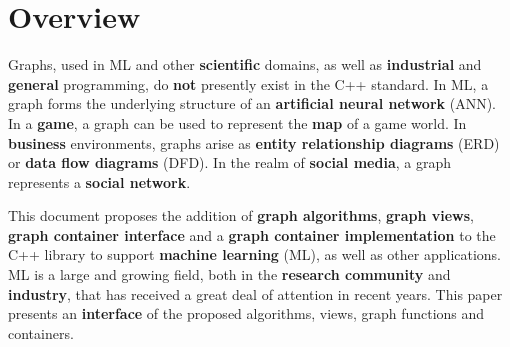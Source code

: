 
\chapter{Overview}

Graphs, used in ML and other \textbf{scientific} domains, as well as \textbf{industrial} and \textbf{general} programming, 
do \textbf{not} presently exist in the C++ standard. In ML, a graph forms the underlying structure of an \textbf{artificial neural network} (ANN). 
In a \textbf{game}, a graph can be used to represent the \textbf{map} of a game world. In \textbf{business} environments, graphs arise as 
\textbf{entity relationship diagrams} (ERD) or \textbf{data flow diagrams} (DFD). In the realm of \textbf{social media}, a graph represents a 
\textbf{social network}.

This document proposes the addition of \textbf{graph algorithms}, \textbf{graph views}, \textbf{graph container interface} and a 
\textbf{graph container implementation} to the C++ library to support \textbf{machine learning} (ML), as well as other applications. 
ML is a large and growing field, both in the \textbf{research community} and \textbf{industry}, that has received a great deal of 
attention in recent years. This paper presents an \textbf{interface} of the proposed algorithms, views, graph functions and containers.

